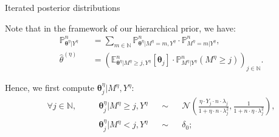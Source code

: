 \documentclass[final,hyperref={pdfpagelabels=false}]{beamer}
\begin{document}
\begin{frame}[t]
\begin{columns}[t]
\begin{column}{.30\textwidth}
\begin{block}{\rule{0pt}{2.5ex} Iterated posterior distributions}
Note that in the framework of our hierarchical prior, we have:
\textcolor{red!90!black}{
\begin{alignat*}{2}
&\mathbb{P}_{\boldsymbol{\theta}^{\eta}\vert Y^{\eta}}^{n} &&= \sum\limits_{m \in \mathbb{N}} \mathbb{P}_{\boldsymbol{\theta}^{\eta} \vert M^{\eta} = m, Y^{\eta}}^{n} \cdot \mathbb{P}^{n}_{M^{\eta} = m \vert Y^{\eta}},\\
&\widehat{\theta}^{\left(\eta\right)} &&= \left(\mathbb{E}_{\boldsymbol{\theta}^{\eta}\vert M^{\eta} \geq j, Y^{\eta}}^{n}\left[\boldsymbol{\theta}_{j}\right] \cdot \mathbb{P}_{M^{\eta} \vert Y^{\eta}}^{n}\left(M^{\eta} \geq j\right)\right)_{j \in \mathbb{N}}.
\end{alignat*}}

Hence, we first compute $\boldsymbol{\theta}^{\eta}_{j} \vert M^{\eta}, Y^{\eta}$:
\textcolor{red!90!black}{\begin{alignat*}{4}
& \forall j \in \mathbb{N}, && \quad \boldsymbol{\theta}^{\eta}_{j} \vert M^{\eta} \geq j, Y^{\eta} &&\sim &&\mathcal{N}\left(\frac{\eta \cdot Y_{j} \cdot n \cdot \lambda_{j}}{1 + \eta \cdot n \cdot \lambda_{j}^{2}}, \frac{1}{1 + n \cdot \eta \cdot \lambda_{j}^{2}} \right),\\
&  && \quad \boldsymbol{\theta}^{\eta}_{j} \vert M^{\eta} < j, Y^{\eta} &&\sim &&\delta_{0};
\end{alignat*}}


\end{block}
\end{column}
\end{columns}
\end{frame}
\end{document}
